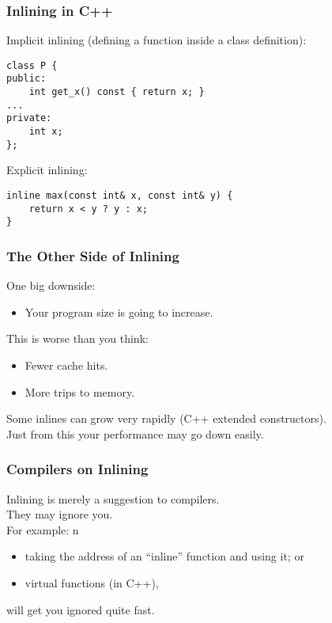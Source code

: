 \begin{frame}[fragile]
  \frametitle{Inlining in C++}

  
  Implicit inlining (defining a function inside a class definition):
  \begin{lstlisting}
class P {
public:
    int get_x() const { return x; }
...
private:
    int x;
};
  \end{lstlisting}
  \vfill
Explicit inlining:
  \begin{lstlisting}
inline max(const int& x, const int& y) {
    return x < y ? y : x;
}
  \end{lstlisting}
  
\end{frame}

\begin{frame}
  \frametitle{The Other Side of Inlining}

  

  One big downside:
  \begin{itemize}
    \item Your program size is going to increase.
  \end{itemize}
   This is worse than you think:
      \begin{itemize}
        \item Fewer cache hits.
        \item More trips to memory.
      \end{itemize}
   Some inlines can grow very rapidly (C++ extended constructors).\\[1em]
  Just from this your performance may go down easily.
  
\end{frame}

\begin{frame}
  \frametitle{Compilers on Inlining}

  

  Inlining is merely a suggestion to compilers.\\
  They may ignore you.\\[1em]

  For example:
n  \begin{itemize}
    \item taking the address of an ``inline'' function and using it; or
    \item virtual functions (in C++),
  \end{itemize}
  will get you ignored quite fast.
  
\end{frame}

